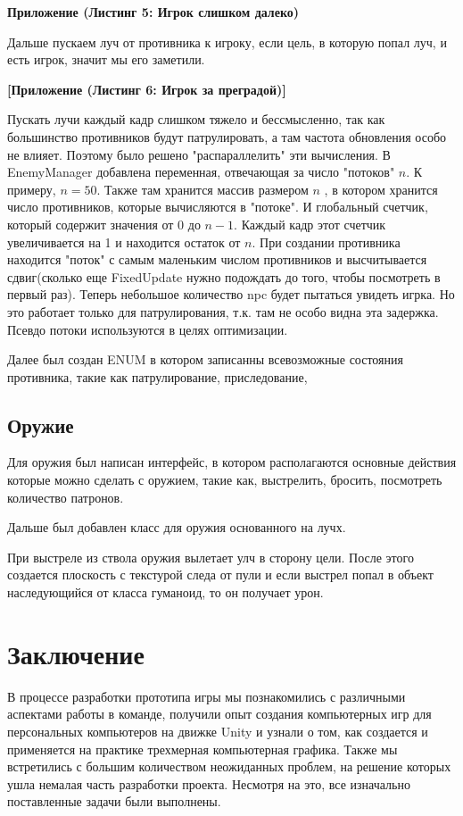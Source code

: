 \documentclass[14pt, titlepage,fleqn,a4paper]{extarticle}
\begin{document}
    \textbf{Приложение (Листинг 5: Игрок слишком далеко)}
    
    Дальше пускаем луч от противника к игроку, если цель, в которую попал луч, и есть игрок, значит мы его заметили.
    
    \textbf{[Приложение (Листинг 6: Игрок за преградой)]}
    
    
Пускать лучи каждый кадр слишком тяжело и бессмысленно, так как большинство противников будут патрулировать, а там частота обновления особо не влияет. Поэтому было решено "распараллелить" эти вычисления. В EnemyManager добавлена переменная, отвечающая за число "потоков" $n$. К примеру, $n = 50$. Также там хранится массив размером $n$ , в котором хранится число противников, которые вычисляются в "потоке". И глобальный счетчик, который содержит значения от 0 до $n - 1$. Каждый кадр этот счетчик увеличивается на 1 и находится остаток от $n$. При создании противника находится "поток" с самым маленьким числом противников и высчитывается сдвиг(сколько еще FixedUpdate нужно подождать до того, чтобы посмотреть в первый раз). Теперь небольшое количество npc будет пытаться увидеть игрка. Но это работает только для патрулирования, т.к. там не особо видна эта задержка. Псевдо потоки используются в целях оптимизации.

Далее был создан ENUM в котором записанны всевозможные состояния противника, такие как патрулирование, приследование, 

    \newpage
    \subsection*{Оружие}
	
	Для оружия был написан интерфейс, в котором располагаются основные действия которые можно сделать с оружием, такие как, выстрелить, бросить, посмотреть количество патронов.
	
	Дальше был добавлен класс для оружия основанного на лучх.
	
	При выстреле из ствола оружия вылетает улч в сторону цели. После этого создается плоскость с текстурой следа от пули и если выстрел попал в объект наследующийся от класса гуманоид, то он получает урон.
	
	\section*{Заключение}
	В процессе разработки прототипа игры мы познакомились с различными аспектами работы в команде, получили опыт создания компьютерных игр для персональных компьютеров на движке Unity и узнали о том, как создается и применяется на практике трехмерная компьютерная графика. Также мы встретились с большим количеством неожиданных проблем, на решение которых ушла немалая часть разработки проекта. Несмотря на это, все изначально поставленные задачи были выполнены.
	\newpage
\end{document}
